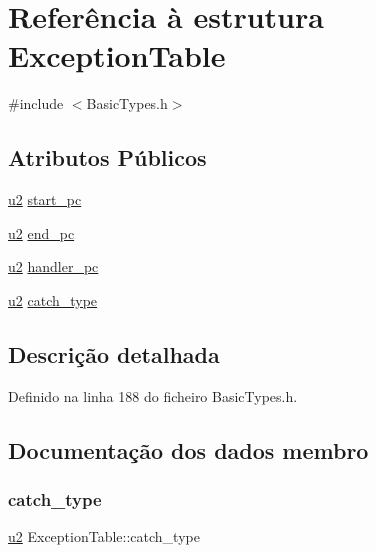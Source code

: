 \hypertarget{structExceptionTable}{}\section{Referência à estrutura Exception\+Table}
\label{structExceptionTable}


{\ttfamily \#include $<$Basic\+Types.\+h$>$}

\subsection*{Atributos Públicos}
\begin{DoxyCompactItemize}
\item 
\hyperlink{BasicTypes_8h_a732cde1300aafb73b0ea6c2558a7a54f}{u2} \hyperlink{structExceptionTable_af137b3a966825f91146039797d3b1ba5}{start\+\_\+pc}
\item 
\hyperlink{BasicTypes_8h_a732cde1300aafb73b0ea6c2558a7a54f}{u2} \hyperlink{structExceptionTable_ac2df73606ebe48af50a629f83fe9c677}{end\+\_\+pc}
\item 
\hyperlink{BasicTypes_8h_a732cde1300aafb73b0ea6c2558a7a54f}{u2} \hyperlink{structExceptionTable_a664ec4b395e02d3a5bfa6cef3493c1e7}{handler\+\_\+pc}
\item 
\hyperlink{BasicTypes_8h_a732cde1300aafb73b0ea6c2558a7a54f}{u2} \hyperlink{structExceptionTable_a440736a74baddb4197715e85ef73b836}{catch\+\_\+type}
\end{DoxyCompactItemize}


\subsection{Descrição detalhada}


Definido na linha 188 do ficheiro Basic\+Types.\+h.



\subsection{Documentação dos dados membro}
\mbox{\label{structExceptionTable_a440736a74baddb4197715e85ef73b836}} 
\subsubsection{\texorpdfstring{catch\+\_\+type}{catch\_type}}
{\footnotesize\ttfamily \hyperlink{BasicTypes_8h_a732cde1300aafb73b0ea6c2558a7a54f}{u2} Exception\+Table\+::catch\+\_\+type}



